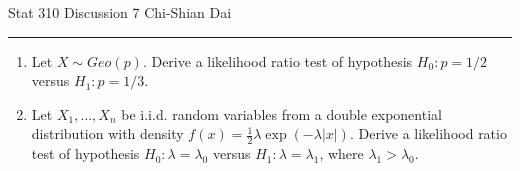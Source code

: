 \documentclass[12pt]{article}
\begin{document}
	\noindent Stat 310 \hfill  Discussion 7 \hfill Chi-Shian Dai
\smallskip
	\hrule
\begin{enumerate}

\item Let $X\sim Geo(p)$. Derive a likelihood ratio test of hypothesis $H_0:p=1/2$ versus $H_1: p=1/3$.
\vspace{8 cm}
\item Let $X_1,\dots, X_n$ be i.i.d. random variables from a double exponential distribution with density $f(x)=\frac{1}{2}\lambda \exp(-\lambda|x|)$. Derive a likelihood ratio test of hypothesis $H_0:\lambda=\lambda_0$ versus $H_1: \lambda=\lambda_1$, where $\lambda_1>\lambda_0.$
\end{enumerate}
\end{document}
